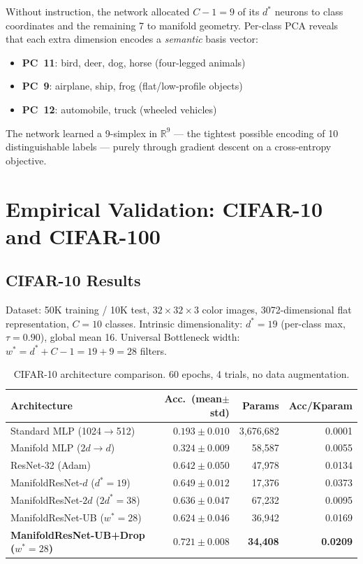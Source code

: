 \documentclass[11pt,letterpaper]{article}
\begin{document}
Without instruction, the network allocated $C-1=9$ of its $d^*$ neurons to
class coordinates and the remaining 7 to manifold geometry.  Per-class PCA
reveals that each extra dimension encodes a \emph{semantic} basis vector:

\begin{itemize}[nosep]
  \item \textbf{PC~11}: bird, deer, dog, horse (four-legged animals)
  \item \textbf{PC~9}: airplane, ship, frog (flat/low-profile objects)
  \item \textbf{PC~12}: automobile, truck (wheeled vehicles)
\end{itemize}

The network learned a 9-simplex in $\mathbb{R}^9$ — the tightest possible
encoding of 10 distinguishable labels — purely through gradient descent on a
cross-entropy objective.

\section{Empirical Validation: CIFAR-10 and CIFAR-100}
\label{sec:cifar}

\subsection{CIFAR-10 Results}

Dataset: 50K training / 10K test, $32{\times}32{\times}3$ color images,
3072-dimensional flat representation, $C=10$ classes.
Intrinsic dimensionality: $d^* = 19$ (per-class max, $\tau=0.90$), global mean 16.
Universal Bottleneck width: $w^* = d^* + C - 1 = 19 + 9 = 28$ filters.

\begin{table}[h]
\centering
\caption{CIFAR-10 architecture comparison. 60 epochs, 4 trials, no data augmentation.}
\label{tab:cifar10}
\begin{tabular}{@{}lrrr@{}}
\toprule
\textbf{Architecture} & \textbf{Acc.\ (mean$\pm$std)} & \textbf{Params} & \textbf{Acc/Kparam} \\
\midrule
Standard MLP (1024$\to$512) & $0.193 \pm 0.010$ & 3,676,682 & 0.0001 \\
Manifold MLP ($2d{\to}d$) & $0.324 \pm 0.009$ & 58,587 & 0.0055 \\
ResNet-32 (Adam) & $0.642 \pm 0.050$ & 47,978 & 0.0134 \\
ManifoldResNet-$d$ ($d^*=19$) & $0.649 \pm 0.012$ & 17,376 & 0.0373 \\
ManifoldResNet-$2d$ ($2d^*=38$) & $0.636 \pm 0.047$ & 67,232 & 0.0095 \\
ManifoldResNet-UB ($w^*=28$) & $0.624 \pm 0.046$ & 36,942 & 0.0169 \\
\textbf{ManifoldResNet-UB+Drop ($w^*=28$)} & $\mathbf{0.721 \pm 0.008}$ & \textbf{34,408} & \textbf{0.0209} \\
\bottomrule
\end{tabular}
\end{table}
\end{document}

